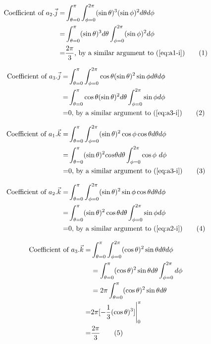 \documentclass[]{article}
\newcommand\numberthis{\addtocounter{equation}{1}\tag{\theequation}}
\begin{document}
\begin{align*}
\text{Coefficient of }a_2.\vec{j} =&\int_{\theta=0}^{\pi}\int_{\phi=0}^{2\pi}(\sin\theta)^3(\sin\phi)^2 d\theta d\phi\\=&\int_{\theta=0}^{\pi}(\sin\theta)^3 d\theta \int_{\phi=0}^{2\pi}(\sin\phi)^2  d\phi\\
=& \frac{2\pi}{3} \text{, by a similar argument to (\ref{eq:a1-i})} \numberthis \label{eq:a2-j}
\end{align*}

\begin{align*}
\text{Coefficient of }a_3.\vec{j} =&\int_{\theta=0}^{\pi}\int_{\phi=0}^{2\pi}\cos\theta(\sin\theta)^2\sin\phi  d\theta d\phi\\=&\int_{\theta=0}^{\pi}\cos\theta(\sin\theta)^2d\theta\int_{\phi=0}^{2\pi}\sin\phi   d\phi\\=&0 \text{, by a similar argument to (\ref{eq:a3-i})} \numberthis \label{eq:a3-j}
\end{align*}

\begin{align*}
\text{Coefficient of }a_1.\vec{k} =&\int_{\theta=0}^{\pi}\int_{\phi=0}^{2\pi}(\sin\theta)^2\cos\phi\cos\theta d\theta d\phi\\=&
\int_{\theta=0}^{\pi}  (\sin\theta)^2 cos\theta d\theta \int_{\phi=0}^{2\pi}\cos\phi\ d\phi\\
=&0 \text{, by a similar argument to (\ref{eq:a3-i})} \numberthis \label{eq:a1-k}
\end{align*}

\begin{align*}
\text{Coefficient of }a_2.\vec{k} =&\int_{\theta=0}^{\pi}\int_{\phi=0}^{2\pi}(\sin\theta)^2\sin\phi\cos\theta d\theta d\phi\\=&
\int_{\theta=0}^{\pi} (\sin\theta)^2 \cos\theta d\theta \int_{\phi=0}^{2\pi}\sin\phi d\phi\\=&0 \text{, by a similar argument to (\ref{eq:a2-i})} \numberthis \label{eq:a2-k}
\end{align*}

\begin{align*}
\text{Coefficient of }a_3.\vec{k} =&\int_{\theta=0}^{\pi} \int_{\phi=0}^{2\pi} (\cos\theta)^2\sin\theta d\theta   d\phi\\ &= \int_{\theta=0}^{\pi} (\cos\theta)^2\sin\theta d\theta  \int_{\phi=0}^{2\pi} d\phi \\ &= 2 \pi \int_{\theta=0}^{\pi} (\cos\theta)^2\sin\theta d\theta \\
=& 2\pi[-\frac{1}{3}(\cos\theta)^3] \Bigg|_0^{\pi} \\
=& \frac{2\pi}{3}\numberthis \label{eq:a3-k}
\end{align*}
\end{document}
